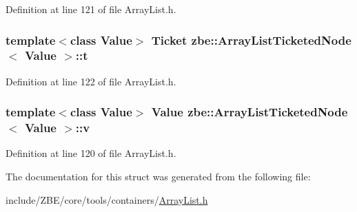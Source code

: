 Definition at line 121 of file Array\+List.\+h.

\hypertarget{structzbe_1_1_array_list_ticketed_node_a4bef8c634cd8a3a31f20c1720a05a2fc}{}
\subsubsection[{t}]{\setlength{\rightskip}{0pt plus 5cm}template$<$class Value$>$ {\bf Ticket} {\bf zbe\+::\+Array\+List\+Ticketed\+Node}$<$ Value $>$\+::t}\label{structzbe_1_1_array_list_ticketed_node_a4bef8c634cd8a3a31f20c1720a05a2fc}


Definition at line 122 of file Array\+List.\+h.

\hypertarget{structzbe_1_1_array_list_ticketed_node_ae04e02e278b795dc6f657df33b0d52e1}{}
\subsubsection[{v}]{\setlength{\rightskip}{0pt plus 5cm}template$<$class Value$>$ Value {\bf zbe\+::\+Array\+List\+Ticketed\+Node}$<$ Value $>$\+::v}\label{structzbe_1_1_array_list_ticketed_node_ae04e02e278b795dc6f657df33b0d52e1}


Definition at line 120 of file Array\+List.\+h.



The documentation for this struct was generated from the following file\+:\begin{DoxyCompactItemize}
\item 
include/\+Z\+B\+E/core/tools/containers/\hyperlink{_array_list_8h}{Array\+List.\+h}\end{DoxyCompactItemize}
